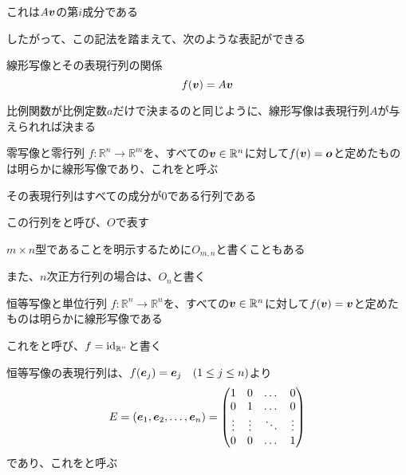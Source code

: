 \documentclass[../../../topic_linear-algebra]{subfiles}
\begin{document}
これは$A\vb*{v}$の第$i$成分である

\br

したがって、この記法を踏まえて、次のような表記ができる

\begin{theorem*}{線形写像とその表現行列の関係}
  \begin{equation*}
    f(\vb*{v}) = A\vb*{v}
  \end{equation*}
\end{theorem*}

比例関数が比例定数$a$だけで決まるのと同じように、線形写像は表現行列$A$が与えられれば決まる

\sectionline

\begin{definition*}{零写像と零行列}
  $f\colon \mathbb{R}^n \to \mathbb{R}^m$を、すべての$\vb*{v} \in \mathbb{R}^n$に対して$f(\vb*{v}) = \vb*{o}$と定めたものは明らかに線形写像であり、これをと呼ぶ

  その表現行列はすべての成分が0である行列である

  この行列をと呼び、$O$で表す
\end{definition*}

$m \times n$型であることを明示するために$O_{m,n}$と書くこともある

また、$n$次正方行列の場合は、$O_n$と書く

\sectionline

\begin{definition*}{恒等写像と単位行列}
  $f\colon \mathbb{R}^n \to \mathbb{R}^n$を、すべての$\vb*{v} \in \mathbb{R}^n$に対して$f(\vb*{v}) = \vb*{v}$と定めたものは明らかに線形写像である

  これをと呼び、$f = \operatorname{id}_{\mathbb{R}^n}$と書く

  恒等写像の表現行列は、$f(\vb*{e}_j) = \vb*{e}_j \quad (1 \leq j \leq n)$より
  \begin{equation*}
    E = (\vb*{e}_1, \vb*{e}_2, \dots, \vb*{e}_n) = \begin{pmatrix}
      1      & 0      & \dots  & 0      \\
      0      & 1      & \dots  & 0      \\
      \vdots & \vdots & \ddots & \vdots \\
      0      & 0      & \dots  & 1
    \end{pmatrix}
  \end{equation*}
  であり、これをと呼ぶ
\end{definition*}
\end{document}
